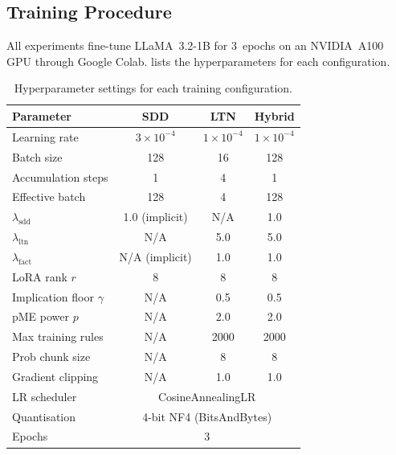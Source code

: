 \documentclass[11pt,a4paper]{article}
\begin{document}
\subsection{Training Procedure}

All experiments fine-tune LLaMA~3.2-1B for 3~epochs on an NVIDIA~A100 GPU
through Google Colab.   lists the hyperparameters
for each configuration.

\begin{table}[H]
\centering
\caption{Hyperparameter settings for each training configuration.}
\label{tab:hyperparams}
\begin{tabular}{@{}lccc@{}}
\toprule
\textbf{Parameter} & \textbf{SDD} & \textbf{LTN} & \textbf{Hybrid} \\
\midrule
Learning rate          & $3{\times}10^{-4}$ & $1{\times}10^{-4}$ & $1{\times}10^{-4}$ \\
Batch size             & 128                & 16                  & 128                \\
Accumulation steps     & 1                  & 4                   & 1                  \\
Effective batch        & 128                & 4                   & 128                \\
$\lambda_{\text{sdd}}$ & 1.0 (implicit)     & N/A                 & 1.0                \\
$\lambda_{\text{ltn}}$ & N/A                & 5.0                 & 5.0                \\
$\lambda_{\text{fact}}$& N/A (implicit)     & 1.0                 & 1.0                \\
LoRA rank $r$          & 8                  & 8                   & 8                  \\
Implication floor $\gamma$ & N/A            & 0.5                 & 0.5                \\
pME power $p$          & N/A                & 2.0                 & 2.0                \\
Max training rules     & N/A                & 2000                & 2000               \\
Prob chunk size        & N/A                & 8                   & 8                  \\
Gradient clipping      & N/A                & 1.0                 & 1.0                \\
LR scheduler           & \multicolumn{3}{c}{CosineAnnealingLR}                       \\
Quantisation           & \multicolumn{3}{c}{4-bit NF4 (BitsAndBytes)}                \\
Epochs                 & \multicolumn{3}{c}{3}                                       \\
\bottomrule
\end{tabular}
\end{table}
\end{document}
